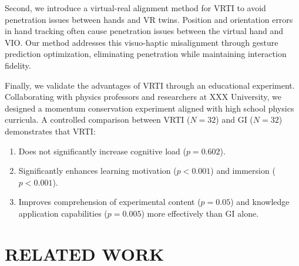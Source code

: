 \documentclass[runningheads]{llncs}
\begin{document}

Second, we introduce a virtual-real alignment method for VRTI to avoid penetration issues between hands and VR twins. Position and orientation errors in hand tracking often cause penetration issues between the virtual hand and VIO. Our method addresses this visuo-haptic misalignment through gesture prediction optimization, eliminating penetration while maintaining interaction fidelity.

Finally, we validate the advantages of VRTI through an educational experiment. Collaborating with physics professors and researchers at XXX
University, we designed a momentum conservation experiment aligned with high school physics curricula. A controlled comparison between VRTI ($N=32$) and GI ($N=32$) demonstrates that VRTI:

\begin{enumerate}
  \item Does not significantly increase cognitive load ($p = 0.602$).

  \item Significantly enhances learning motivation ($p < 0.001$) and immersion ($p < 0.001$).

  \item Improves comprehension of experimental content ($p = 0.05$) and knowledge application capabilities ($p = 0.005$) more effectively than GI alone.
\end{enumerate}


\section{RELATED WORK}
\end{document}
